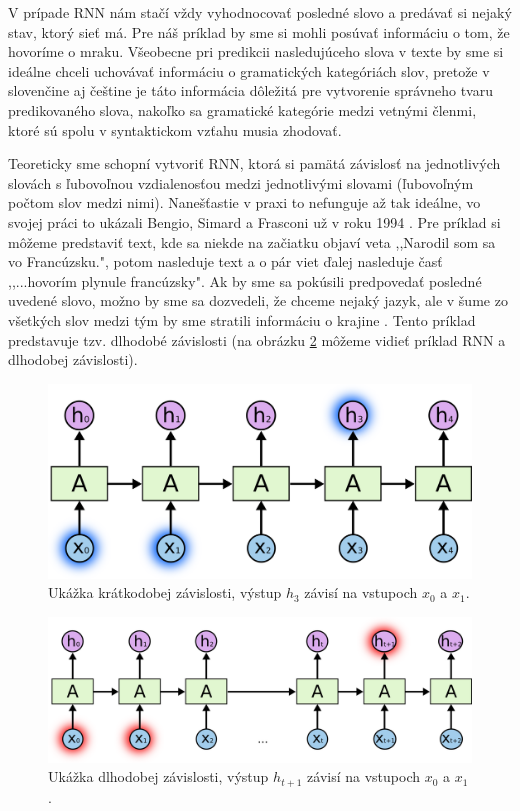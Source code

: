 V prípade RNN nám stačí vždy vyhodnocovať posledné slovo a predávať si nejaký stav, ktorý sieť má. Pre náš príklad by sme si mohli posúvať informáciu o tom, že hovoríme o mraku. Všeobecne pri predikcii nasledujúceho slova v texte by sme si ideálne chceli uchovávať informáciu o gramatických kategóriách slov, pretože v slovenčine aj češtine je táto informácia dôležitá pre vytvorenie správneho tvaru predikovaného slova, nakoľko sa gramatické kategórie medzi vetnými členmi, ktoré sú spolu v syntaktickom vzťahu musia zhodovať.

Teoreticky sme schopní vytvoriť RNN, ktorá si pamätá závislosť na jednotlivých slovách s ľubovoľnou vzdialenosťou medzi jednotlivými slovami (ľubovoľným počtom slov medzi nimi). Nanešťastie v praxi to nefunguje až tak ideálne, vo svojej práci to ukázali Bengio, Simard a Frasconi už v roku 1994 \citep{rnn:bengio}.
Pre príklad si môžeme predstaviť text, kde sa niekde na začiatku objaví veta ,,Narodil som sa vo Francúzsku.", potom nasleduje text a o pár viet ďalej nasleduje časť ,,...hovorím plynule francúzsky". Ak by sme sa pokúsili predpovedať posledné uvedené slovo, možno by sme sa dozvedeli, že chceme nejaký jazyk, ale v šume zo všetkých slov medzi tým by sme stratili informáciu o krajine \citep{rnn:colah}.
Tento príklad predstavuje tzv. dlhodobé závislosti (na obrázku \ref{rnn:ltd} môžeme vidieť príklad RNN a dlhodobej závislosti).


\begin{figure} 
\includegraphics[width=\textwidth]{../img/rnn-std.png}
\caption{Ukážka krátkodobej závislosti, výstup $h_3$ závisí na vstupoch $x_0$ a $x_1$\citep{rnn:colah}.}
\label{rnn:std}
\end{figure}
\begin{figure} 
\includegraphics[width=\textwidth]{../img/rnn_ltd.png}
\caption{Ukážka dlhodobej závislosti, výstup $h_{t+1}$ závisí na vstupoch $x_0$ a $x_1$ \citep{rnn:colah}.}
\label{rnn:ltd}
\end{figure}

